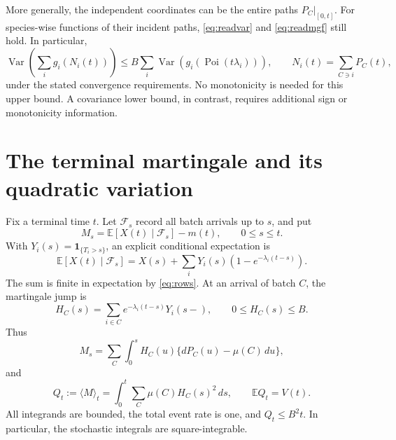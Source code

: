 \documentclass[11pt]{article}
\numberwithin{equation}{section}
\theoremstyle{definition}
\theoremstyle{remark}
\newcommand{\E}{\mathbb E}
\newcommand{\ind}{\mathbf 1}
\newcommand{\Var}{\operatorname{Var}}
\newcommand{\Poi}{\operatorname{Poi}}
\begin{document}
More generally, the independent coordinates can be the entire paths
$P_C|_{[0,t]}$. For species-wise functions of their incident paths,
\eqref{eq:readvar} and \eqref{eq:readmgf} still hold. In particular,
\begin{equation}\label{eq:generalfunctionalvariance}
 \Var\left(\sum_i g_i(N_i(t))\right)
 \le B\sum_i\Var(g_i(\Poi(t\lambda_i))),\qquad
 N_i(t)=\sum_{C\ni i}P_C(t),
\end{equation}
under the stated convergence requirements. No monotonicity is needed for this
upper bound. A covariance lower bound, in contrast, requires additional sign
or monotonicity information.

\section{The terminal martingale and its quadratic variation}\label{sec:bracket}

Fix a terminal time $t$. Let $\mathcal F_s$ record all batch arrivals up to $s$,
and put
\[
 M_s=\E[X(t)\mid\mathcal F_s]-m(t),\qquad 0\le s\le t.
\]
With $Y_i(s)=\ind_{\{T_i>s\}}$, an explicit conditional expectation is
\[
 \E[X(t)\mid\mathcal F_s]
 =X(s)+\sum_iY_i(s)(1-e^{-\lambda_i(t-s)}).
\]
The sum is finite in expectation by \eqref{eq:rows}. At an arrival of batch
$C$, the martingale jump is
\begin{equation}\label{eq:H}
 H_C(s)=\sum_{i\in C}e^{-\lambda_i(t-s)}Y_i(s-),
 \qquad 0\le H_C(s)\le B.
\end{equation}
Thus
\begin{equation}\label{eq:martrep}
 M_s=\sum_C\int_0^s H_C(u)\{dP_C(u)-\mu(C)\,du\},
\end{equation}
and
\begin{equation}\label{eq:bracketdef}
 Q_t:=\langle M\rangle_t
 =\int_0^t\sum_C\mu(C)H_C(s)^2\,ds,
 \qquad \E Q_t=V(t).
\end{equation}
All integrands are bounded, the total event rate is one, and $Q_t\le B^2t$.
In particular, the stochastic integrals are square-integrable.
\end{document}
